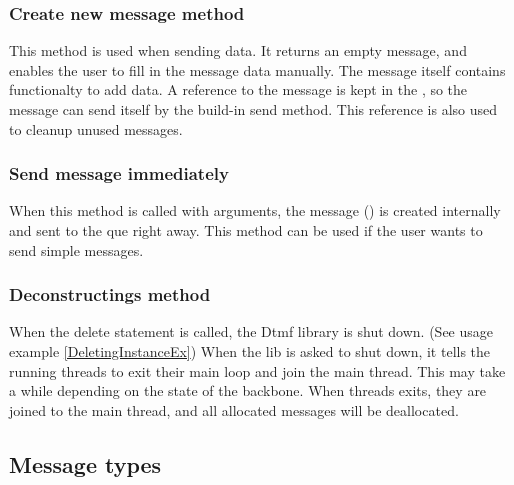 \subsubsection{Create new message method}
This method is used when sending data. It returns an empty  message, and enables the user to fill in the message data manually. The message itself contains functionalty to add data. A reference to the message is kept in the , so the message can send itself by the build-in send method. This reference is also used to cleanup unused messages.

\subsubsection{Send message immediately}
When this method is called with arguments, the message () is created internally and sent to the que right away. This method can be used if the user wants to send simple messages.

\subsubsection{Deconstructings method}
When the delete statement is called, the Dtmf library is shut down. (See usage example \ref{DeletingInstanceEx}) When the lib is asked to shut down, it tells the running threads to exit their main loop and join the main thread. This may take a while depending on the state of the backbone. When threads exits, they are joined to the main thread, and all allocated messages will be deallocated.


\subsection{Message types}
